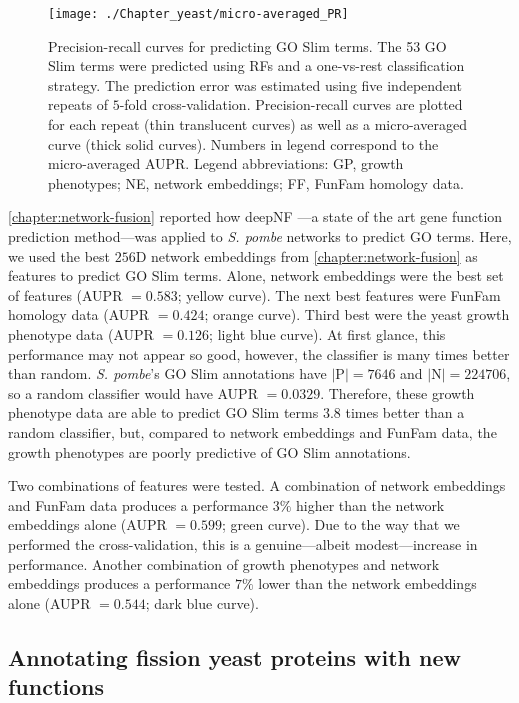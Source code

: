 \begin{figure}[!hbt]
    \centering
    \texttt{[image: ./Chapter\_yeast/micro-averaged\_PR]}
    \caption{%
        Precision-recall curves for predicting GO Slim terms.
        The 53 GO Slim terms were predicted using RFs and a one-vs-rest classification strategy.
        The prediction error was estimated using five independent repeats of $5$-fold cross-validation.
        Precision-recall curves are plotted for each repeat (thin translucent curves) as well as a micro-averaged curve (thick solid curves).
        Numbers in legend correspond to the micro-averaged AUPR.
        Legend abbreviations: GP, growth phenotypes; NE, network embeddings; FF, FunFam homology data.
    }
    \label{fig:pr-go-slim}
\end{figure}

\ref{chapter:network-fusion} reported how deepNF \cite{Gligorijevic2018}---a state of the art gene function prediction method---was applied to \emph{S. pombe} networks to predict GO terms.
Here, we used the best $256$D network embeddings from \ref{chapter:network-fusion} as features to predict GO Slim terms. Alone, network embeddings were the best set of features (AUPR $= 0.583$; yellow curve). The next best features were FunFam homology data (AUPR $= 0.424$; orange curve). Third best were the yeast growth phenotype data (AUPR $= 0.126$; light blue curve). At first glance, this performance may not appear so good, however, the classifier is many times better than random. \emph{S. pombe}'s GO Slim annotations have $|\text{P}|= \num{7646}$ and $|\text{N}|= \num{224706}$, so a random classifier would have AUPR $= 0.0329$. Therefore, these growth phenotype data are able to predict GO Slim terms $3.8$ times better than a random classifier, but, compared to network embeddings and FunFam data, the growth phenotypes are poorly predictive of GO Slim annotations.

Two combinations of features were tested. A combination of network embeddings and FunFam data produces a performance $3\%$ higher than the network embeddings alone (AUPR $= 0.599$; green curve). Due to the way that we performed the cross-validation, this is a genuine---albeit modest---increase in performance. Another combination of growth phenotypes and network embeddings produces a performance $7\%$ lower than the network embeddings alone (AUPR $= 0.544$; dark blue curve).

\subsection{Annotating fission yeast proteins with new functions}

